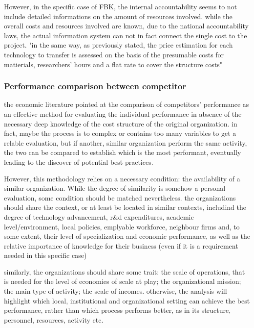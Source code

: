 However, in the specific case of FBK, the internal accountability seems to not include detailed informations on the amount of resources involved. while the overall costs and resources involved are known, due to the national accountability laws, the actual information system can not in fact connect the single cost to the project. "in the same way, as previously stated, the price estimation for each technology to transfer is assessed on the basis of the presumable costs for matierials, researchers' hours and a flat rate to cover the structure costs"

\subsubsection{Performance comparison between competitor}

the economic literature pointed at the comparison of competitors' performance as an effective method for evaluating the individual performance in absence of the necessary deep knowledge of the cost structure of the original organization. in fact, maybe the process is to complex or contains too many variables to get a relable evaluation, but if another, similar organization perform the same activity, the two can be compared to establish which is the most performant, eventually leading to the discover of potential best practices.

However, this methodology relies on a necessary condition: the availability of a similar organization. While the degree of similarity is somehow a personal evaluation, some condition should be matched nevertheless. the organizations should share the context, or at least be located in similar contexts, includind the degree of technology advancement, r\&d expenditures, academic level/environment, local policies, emplyable workforce, neighbour firms and, to some extent, their level of specialization and economic performance, as well as the relative importance of knowledge for their business (even if it is a requirement needed in this specific case)

similarly, the organizations should share some trait: the scale of operations, that is needed for the level of economies of scale at play; the organizational mission; the main type of activity; the scale of incomes. otherwise, the analysis will highlight which local, institutional and organizational setting can achieve the best performance, rather than which process performs better, as in its structure, personnel, resources, activity etc.

